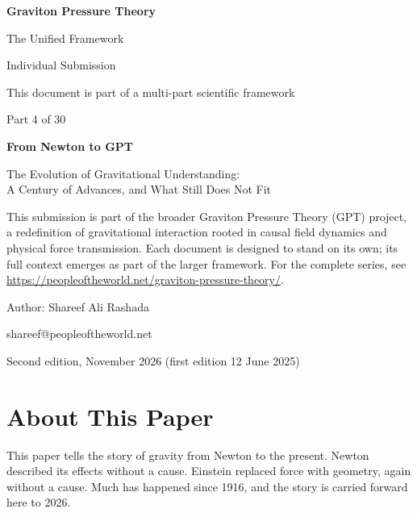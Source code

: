 \documentclass[11pt,a4paper]{article}
\begin{document}
\begin{titlepage}
\centering
\vspace*{1.5cm}
{\Huge\bfseries Graviton Pressure Theory\par}
\vspace{0.4cm}
{\Large The Unified Framework\par}
{\large Individual Submission\par}
\vspace{0.3cm}
{\normalsize This document is part of a multi-part scientific framework\par}
\vspace{1.6cm}
{\large Part 4 of 30\par}
\vspace{0.6cm}
{\huge\bfseries From Newton to GPT\par}
\vspace{0.5cm}
{\Large The Evolution of Gravitational Understanding:\\[2pt] A Century of Advances, and What Still Does Not Fit\par}
\vspace{1.4cm}
\begin{minipage}{0.82\textwidth}\centering\small
This submission is part of the broader Graviton Pressure Theory (GPT) project, a redefinition of gravitational interaction rooted in causal field dynamics and physical force transmission. Each document is designed to stand on its own; its full context emerges as part of the larger framework. For the complete series, see \url{https://peopleoftheworld.net/graviton-pressure-theory/}.
\end{minipage}
\vfill
{\large Author: Shareef Ali Rashada\par}
{\normalsize shareef@peopleoftheworld.net\par}
\vspace{0.3cm}
{\normalsize Second edition, November 2026 \quad (first edition 12 June 2025)\par}
\end{titlepage}

\tableofcontents
\newpage

\section*{About This Paper}

This paper tells the story of gravity from Newton to the present. Newton described its effects without a cause. Einstein replaced force with geometry, again without a cause. Much has happened since 1916, and the story is carried forward here to 2026.
\end{document}
